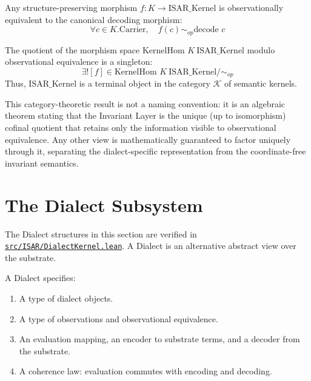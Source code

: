 \begin{theorem}
Any structure-preserving morphism $f : K \to \text{ISAR\_Kernel}$ is observationally equivalent to the canonical decoding morphism:
$$\forall c \in K.\text{Carrier}, \quad f(c) \sim_{op} \text{decode } c$$
\end{theorem}

\begin{theorem}
The quotient of the morphism space $\text{KernelHom } K\ \text{ISAR\_Kernel}$ modulo observational equivalence is a singleton:
$$\exists! [f] \in \text{KernelHom } K\ \text{ISAR\_Kernel} / \sim_{op}$$
Thus, $\text{ISAR\_Kernel}$ is a terminal object in the category $\mathcal{K}$ of semantic kernels.
\end{theorem}

This category-theoretic result is not a naming convention: it is an algebraic theorem stating that the Invariant Layer is the unique (up to isomorphism) cofinal quotient that retains only the information visible to observational equivalence. Any other view is mathematically guaranteed to factor uniquely through it, separating the dialect-specific representation from the coordinate-free invariant semantics.

\section{The Dialect Subsystem}

The Dialect structures in this section are verified in \href{https://github.com/cypoe/isar-proofs/blob/master/src/ISAR/DialectKernel.lean}{\texttt{src/ISAR/DialectKernel.lean}}. A Dialect is an alternative abstract view over the substrate.

\begin{definition}[Dialect]
A Dialect specifies:
\begin{enumerate}
    \item A type of dialect objects.
    \item A type of observations and observational equivalence.
    \item An evaluation mapping, an encoder to substrate terms, and a decoder from the substrate.
    \item A coherence law: evaluation commutes with encoding and decoding.
\end{enumerate}
\end{definition}
